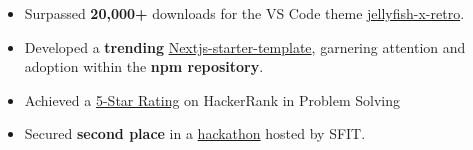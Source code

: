 \smallskip
\begin{itemize} 

\item Surpassed \textbf{20,000+} downloads for the VS Code theme \href{https://marketplace.visualstudio.com/items?itemName=Bhanu1776.jellyfish-retro}{jellyfish-x-retro}.
\smallskip
\item Developed a \textbf{trending} \href{https://www.npmjs.com/package/@bhanu17/nextjs-starter}{Nextjs-starter-template}, garnering attention and adoption within the \textbf{npm repository}.
\smallskip
\item Achieved a \href{https://www.linkedin.com/posts/bhanu1776_achievementunlocked-gratitude-hackerrank-activity-7178401061966147584-jYYN?utm_source=share&utm_medium=member_desktop}{5-Star Rating} on HackerRank in Problem Solving
\smallskip
\item Secured \textbf{second place} in a \href{https://drive.google.com/file/d/1nK1eTLe6yCUdPNcGmBzwhcu8pcJDxh5a/view?usp=sharing}{hackathon} hosted by SFIT.\\
\end{itemize}
